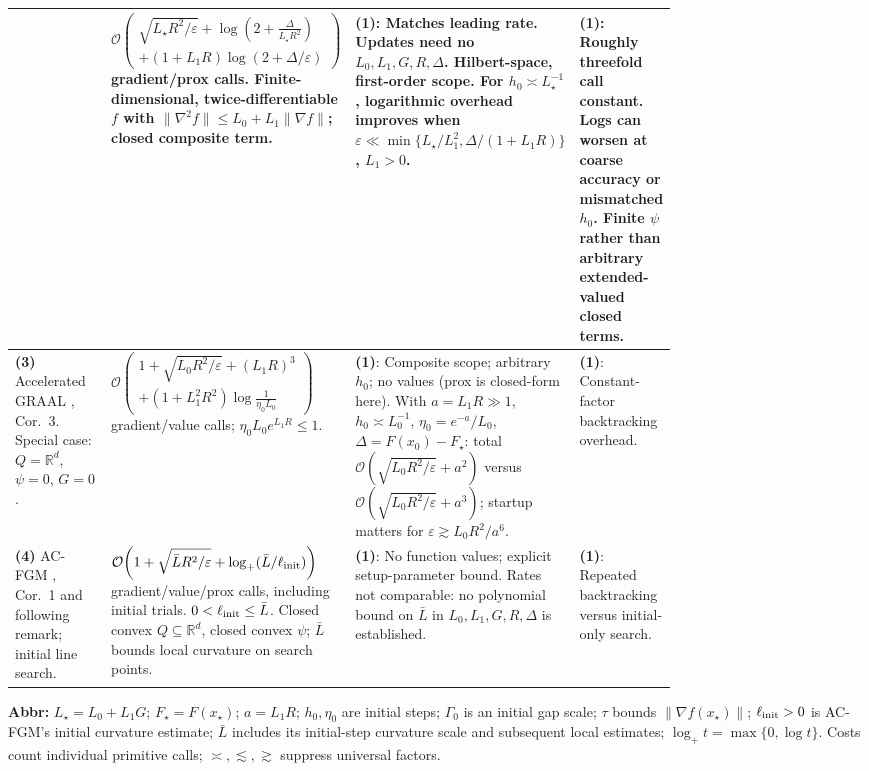 \begin{table}[tp]
\begin{threeparttable}
\begin{tabularx}{\linewidth}{@{}>{\raggedright\arraybackslash}p{0.20\linewidth}>{\raggedright\arraybackslash}p{0.32\linewidth}>{\raggedright\arraybackslash}p{0.25\linewidth}>{\raggedright\arraybackslash}X@{}}
& $\mathcal{O}\!\left(\begin{gathered}\sqrt{L_\star R^2/\varepsilon}+\log\!\left(2+\frac{\Delta}{L_\star R^2}\right)\\ +(1+L_1R)\log(2+\Delta/\varepsilon)\end{gathered}\right)$ gradient/prox calls. Finite-dimensional, twice-differentiable $f$ with $\|\nabla^2f\|\le L_0+L_1\|\nabla f\|$; closed composite term.
& \textbf{(1)}: Matches leading rate. Updates need no $L_0,L_1,G,R,\Delta$. Hilbert-space, first-order scope. For $h_0\asymp L_\star^{-1}$, logarithmic overhead improves when $\varepsilon\ll\min\{L_\star/L_1^2,\Delta/(1+L_1R)\}$, $L_1>0$.
& \textbf{(1)}: Roughly threefold call constant. Logs can worsen at coarse accuracy or mismatched $h_0$. Finite $\psi$ rather than arbitrary extended-valued closed terms. \\
\midrule
\textbf{(3)} Accelerated GRAAL \citep{BorodichKovalev2025GraalV2}, Cor.~3. Special case: $Q=\mathbb R^d$, $\psi=0$, $G=0$.
& $\mathcal{O}\!\left(\begin{gathered}1+\sqrt{L_0R^2/\varepsilon}+(L_1R)^3\\ +(1+L_1^2R^2)\log\frac1{\eta_0L_0}\end{gathered}\right)$ gradient/value calls; $\eta_0L_0e^{L_1R}\le1$.
& \textbf{(1)}: Composite scope; arbitrary $h_0$; no values (prox is closed-form here). With $a=L_1R\gg1$, $h_0\asymp L_0^{-1}$, $\eta_0=e^{-a}/L_0$, $\Delta=F(x_0)-F_\star$: total $\mathcal{O}(\sqrt{L_0R^2/\varepsilon}+a^2)$ versus $\mathcal{O}(\sqrt{L_0R^2/\varepsilon}+a^3)$; startup matters for $\varepsilon\gtrsim L_0R^2/a^6$.
& \textbf{(1)}: Constant-factor backtracking overhead. \\
\midrule
\textbf{(4)} AC-FGM \citep{LiLan2024AcfgmV3}, Cor.~1 and following remark; initial line search.
& $\mathcal{O}\!\left(1+\sqrt{\bar L R^2/\varepsilon}+\log_+(\bar L/\ell_{\rm init})\right)$ gradient/value/prox calls, including initial trials. $0<\ell_{\rm init}\le\bar L$. Closed convex $Q\subseteq\mathbb R^d$, closed convex $\psi$; $\bar L$ bounds local curvature on search points.
& \textbf{(1)}: No function values; explicit setup-parameter bound. Rates not comparable: no polynomial bound on $\bar L$ in $L_0,L_1,G,R,\Delta$ is established.
& \textbf{(1)}: Repeated backtracking versus initial-only search. \\
\bottomrule
\end{tabularx}
\begin{tablenotes}[flushleft]\footnotesize
\item[] \textbf{Abbr:} $L_\star=L_0+L_1G$; $F_\star=F(x_\star)$; $a=L_1R$; $h_0,\eta_0$ are initial steps; $\Gamma_0$ is an initial gap scale; $\tau$ bounds $\|\nabla f(x_\star)\|$; $\ell_{\rm init}>0$ is AC-FGM's initial curvature estimate; $\bar L$ includes its initial-step curvature scale and subsequent local estimates; $\log_+t=\max\{0,\log t\}$. Costs count individual primitive calls; $\asymp,\lesssim,\gtrsim$ suppress universal factors.

\end{tablenotes}
\end{threeparttable}
\end{table}
